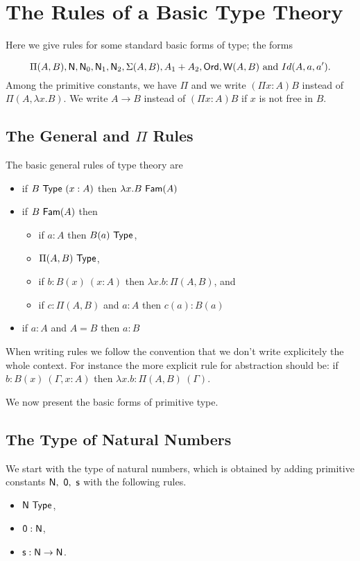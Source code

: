 \section*{The Rules of a Basic Type Theory}
Here we give rules for some standard basic forms of type; the forms 

  $$\Pi(A,B),{\sf N},{\sf N}_0,{\sf N}_1,{\sf N}_2,\Sigma(A,B),A_1+A_2,{\sf Ord},{\sf W}(A,B)
    \mbox{ and }Id(A,a,a').$$
%
Among the primitive constants, we have $\Pi$ and we write $(\Pi x:A)B$ instead
of $\Pi(A,\lambda x.B)$. We write $A\rightarrow B$ instead of $(\Pi x:A)B$ if
$x$ is not free in $B$.

\medskip

\subsection{The General and $\Pi$ Rules}
 The basic general rules of type theory are 
\begin{itemize}
\item if $B~{\sf Type}~(x:A)$ then $\lambda x.B~{\sf Fam}(A)$
\item if $B~{\sf Fam}(A)$ then 
\begin{itemize}
\item if $a:A$ then $B(a)~{\sf Type}$,
\item $\Pi(A,B)~{\sf Type}$,
\item if $b:B(x)~(x:A)$ then $\lambda x.b:\Pi(A,B)$, and
\item if $c:\Pi(A,B)$ and $a:A$ then $c(a):B(a)$
\end{itemize}
\item if $a:A$ and $A= B$ then $a:B$
\end{itemize}

\medskip

 When writing rules we follow the convention that we don't write explicitely the whole context.  For instance the more explicit rule for abstraction should be: if $b:B(x)~(\Gamma,x:A)$ then $\lambda x.b:\Pi(A,B)~(\Gamma)$.

\medskip

We now present the basic forms of primitive type.  

\subsection*{The Type of Natural Numbers}
We start with
the type of natural numbers, which  is obtained by adding primitive constants
${\sf N},~{\sf 0},~{\sf s}$ with the following rules.
\begin{itemize}
\item ${\sf N}~{\sf Type}$,
\item ${\sf 0}:{\sf N}$,
\item ${\sf s}:{\sf N}\rightarrow {\sf N}$.
\end{itemize}


